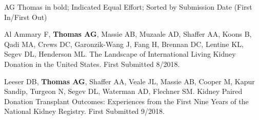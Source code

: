 \documentclass[10pt]{article}
\renewcommand{\section}[1]{\pagebreak[3]%
    \vspace{1.3\baselineskip}%
    \phantomsection\addcontentsline{toc}{section}{#1}%
    \noindent\llap{\scshape\smash{\parbox[t]{\marginparwidth}{\hyphenpenalty=10000\raggedright #1}}}%
    \vspace{-\baselineskip}\par}
\begin{document}
  AG Thomas in bold; \textbf{\dag} Indicated Equal Effort;
  Sorted by Submission Date (First In/First Out)

\vspace{2mm}

\begin{bibenum}

\item Al Ammary F\dag, \textbf{Thomas AG\dag}, Massie AB, Muzaale AD,
  Shaffer AA, Koons B, Qadi MA, Crews DC, Garonzik-Wang J,
  Fang H, Brennan DC, Lentine KL, Segev DL, Henderson ML.
  The Landscape of International Living Kidney Donation in the United States.
  First Submitted 8/2018.

\item Leeser DB, \textbf{Thomas AG}, Shaffer AA, Veale JL, Massie AB, Cooper M,
  Kapur Sandip, Turgeon N, Segev DL, Waterman AD, Flechner SM.
  Kidney Paired Donation Transplant Outcomes: Experiences from the First
  Nine Years of the National Kidney Registry.
  First Submitted 9/2018.

\end{bibenum}







\end{document}
